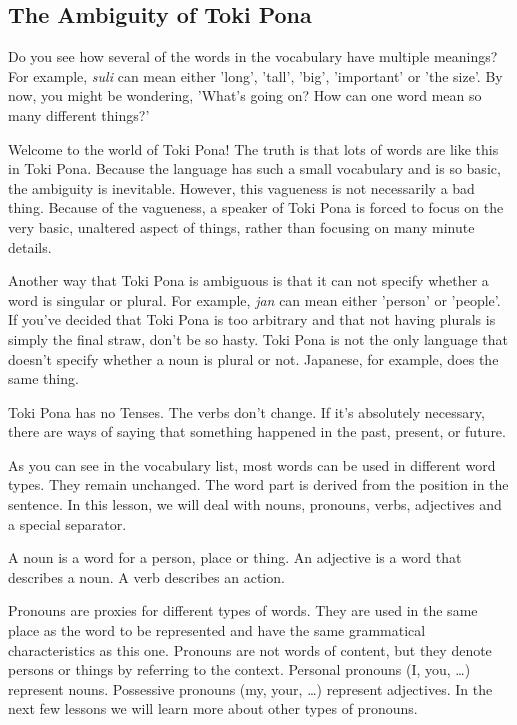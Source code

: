 \subsection*{The Ambiguity of Toki Pona}
%
Do you see how several of the words in the vocabulary have multiple meanings? 
For example, \textit{suli} can mean either 'long', 'tall', 'big', 'important' or 'the size'. 
By now, you might be wondering, 'What's going on? How can one word mean so many different things?' 

Welcome to the world of Toki Pona! The truth is that lots of words are like this in Toki Pona. 
Because the language has such a small vocabulary and is so basic, the ambiguity is inevitable. 
However, this vagueness is not necessarily a bad thing. Because of the vagueness, a speaker of Toki Pona is forced to focus on the very basic, unaltered aspect of things, rather than focusing on many minute details. 

Another way that Toki Pona is ambiguous is that it can not specify whether a word is singular or plural. 
For example, \textit{jan} can mean either 'person' or 'people'. 
If you've decided that Toki Pona is too arbitrary and that not having plurals is simply the final straw, don't be so hasty. 
Toki Pona is not the only language that doesn't specify whether a noun is plural or not. 
Japanese, for example, does the same thing. 

Toki Pona has no Tenses. 
The verbs don't change. 
If it's absolutely necessary, there are ways of saying that something happened in the past, present, or future. 

As you can see in the vocabulary list, most words can be used in different word types. 
They remain unchanged. 
The word part is derived from the position in the sentence. 
In this lesson, we will deal with nouns, pronouns, verbs, adjectives and a special separator. 

A noun is a word for a person, place or thing. 
An adjective is a word that describes a noun. 
A verb describes an action. 

Pronouns are proxies for different types of words. 
They are used in the same place as the word to be represented and have the same grammatical characteristics as this one.
Pronouns are not words of content, but they denote persons or things by referring to the context. 
Personal pronouns (I, you, \dots) represent nouns. 
Possessive pronouns (my, your, \dots) represent adjectives. 
In the next few lessons we will learn more about other types of pronouns. 

